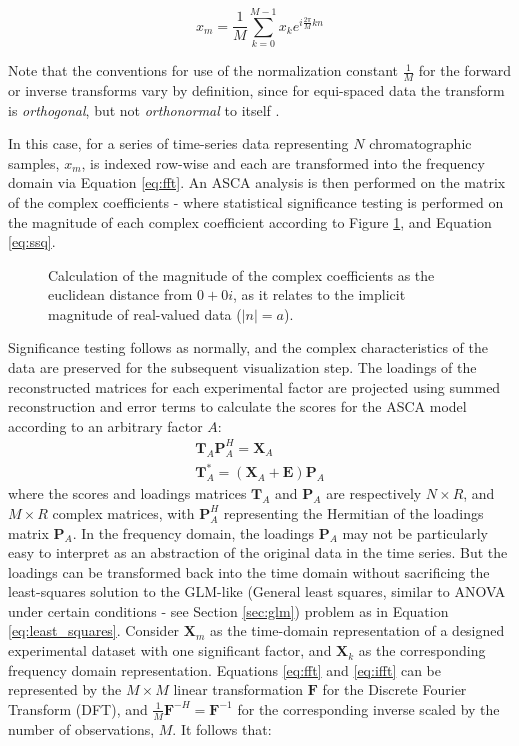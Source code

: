 \documentclass[preprint,12pt]{elsarticle}
\begin{document}
\begin{equation}\label{eq:ifft}
    x_m = \frac{1}{M} \sum_{k=0}^{M-1} x_k e^{i \frac{2\pi}{M} kn}
\end{equation}

Note that the conventions for use of the normalization constant $\frac{1}{M}$ for the forward or inverse transforms vary by definition, since for equi-spaced data the transform is \textit{orthogonal}, but not \textit{orthonormal} to itself \cite{armstrong2023direct}.

In this case, for a series of time-series data representing $N$ chromatographic samples, $x_m$, is indexed row-wise and each are transformed into the frequency domain via Equation \ref{eq:fft}. An ASCA analysis is then performed on the matrix of the complex coefficients - where statistical significance testing is performed on the magnitude of each complex coefficient according to Figure \ref{fig:imag}, and Equation \ref{eq:ssq}.

\begin{figure}[tbh!]
\centering


\caption{Calculation of the magnitude of the complex coefficients as the euclidean distance from $0 + 0i$, as it relates to the implicit magnitude of real-valued data ($|n|=a$).}
\label{fig:imag}
\end{figure}

Significance testing follows as normally, and the complex characteristics of the data are preserved for the subsequent visualization step. The loadings of the reconstructed matrices for each experimental factor are projected using summed reconstruction and error terms to calculate the scores for the ASCA model according to an arbitrary factor $A$:
%
\begin{align}\label{eq:asca}
    \mathbf{T}_A\mathbf{P}_A^H = \mathbf{X}_A \\
    \mathbf{T}^*_A = (\mathbf{X}_A + \mathbf{E})\mathbf{P}_A
\end{align}
%
\noindent where the scores and loadings matrices $\mathbf{T}_A$ and $\mathbf{P}_A$ are respectively $N \times R$, and $M \times R$ complex matrices, with $\mathbf{P}_A^H$ representing the Hermitian of the loadings matrix $\mathbf{P}_A$. In the frequency domain, the loadings $\mathbf{P}_A$ may not be particularly easy to interpret as an abstraction of the original data in the time series. But the loadings can be transformed back into the time domain without sacrificing the least-squares solution to the GLM-like (General least squares, similar to ANOVA under certain conditions - see Section \ref{sec:glm}) problem as in Equation \ref{eq:least_squares}. Consider $\mathbf{X}_m$ as the time-domain representation of a designed experimental dataset with one significant factor, and $\mathbf{X}_k$ as the corresponding frequency domain representation. Equations \ref{eq:fft} and \ref{eq:ifft} can be represented by the $M\times M$ linear transformation $\mathbf{F}$ for the Discrete Fourier Transform (DFT), and $\frac{1}{M}\mathbf{F}^{-H} = \mathbf{F}^{-1}$ for the corresponding inverse scaled by the number of observations, $M$. It follows that:
\end{document}
